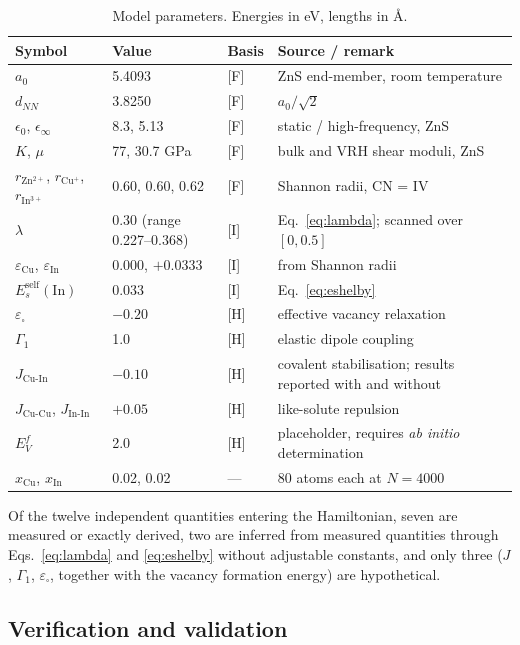 \documentclass[11pt,a4paper]{article}
\begin{document}
\begin{table}[htbp]
\centering
\caption{Model parameters. Energies in eV, lengths in \AA{}.}
\label{tab:params}
\small
\begin{tabular}{llll}
\toprule
Symbol & Value & Basis & Source / remark \\
\midrule
$a_0$ & 5.4093 & [F] & ZnS end-member, room temperature \\
$d_{NN}$ & 3.8250 & [F] & $a_0/\sqrt{2}$ \\
$\epsilon_0$, $\epsilon_\infty$ & 8.3, 5.13 & [F] & static / high-frequency, ZnS \\
$K$, $\mu$ & 77, 30.7 GPa & [F] & bulk and VRH shear moduli, ZnS \\
$r_{\mathrm{Zn^{2+}}}$, $r_{\mathrm{Cu^{+}}}$, $r_{\mathrm{In^{3+}}}$ & 0.60, 0.60, 0.62 & [F] & Shannon radii, CN = IV \\
$\lambda$ & 0.30 (range 0.227--0.368) & [I] & Eq.~\eqref{eq:lambda}; scanned over $[0, 0.5]$ \\
$\varepsilon_{\mathrm{Cu}}$, $\varepsilon_{\mathrm{In}}$ & 0.000, $+0.0333$ & [I] & from Shannon radii \\
$E_s^{\mathrm{self}}(\mathrm{In})$ & 0.033 & [I] & Eq.~\eqref{eq:eshelby} \\
$\varepsilon_\square$ & $-0.20$ & [H] & effective vacancy relaxation \\
$\Gamma_1$ & 1.0 & [H] & elastic dipole coupling \\
$J_{\mathrm{Cu\text{-}In}}$ & $-0.10$ & [H] & covalent stabilisation; results reported with and without \\
$J_{\mathrm{Cu\text{-}Cu}}$, $J_{\mathrm{In\text{-}In}}$ & $+0.05$ & [H] & like-solute repulsion \\
$E^f_V$ & 2.0 & [H] & placeholder, requires \textit{ab initio} determination \\
$x_{\mathrm{Cu}}$, $x_{\mathrm{In}}$ & 0.02, 0.02 & --- & 80 atoms each at $N = 4000$ \\
\bottomrule
\end{tabular}
\end{table}

Of the twelve independent quantities entering the Hamiltonian, seven are
measured or exactly derived, two are inferred from measured quantities through
Eqs.~\eqref{eq:lambda} and \eqref{eq:eshelby} without adjustable constants, and
only three ($J$, $\Gamma_1$, $\varepsilon_\square$, together with the vacancy
formation energy) are hypothetical.

\subsection{Verification and validation}
\label{sec:vv}
\end{document}
